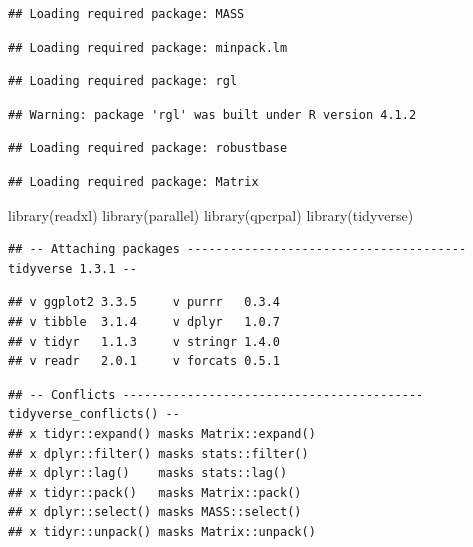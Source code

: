 \documentclass[
]{book}
\newenvironment{Shaded}{\begin{snugshade}}{\end{snugshade}}
\newcommand{\FunctionTok}[1]{\textcolor[rgb]{0.00,0.00,0.00}{#1}}
\newcommand{\NormalTok}[1]{#1}
\begin{document}
\begin{verbatim}
## Loading required package: MASS
\end{verbatim}

\begin{verbatim}
## Loading required package: minpack.lm
\end{verbatim}

\begin{verbatim}
## Loading required package: rgl
\end{verbatim}

\begin{verbatim}
## Warning: package 'rgl' was built under R version 4.1.2
\end{verbatim}

\begin{verbatim}
## Loading required package: robustbase
\end{verbatim}

\begin{verbatim}
## Loading required package: Matrix
\end{verbatim}

\begin{Shaded}
\begin{Highlighting}[]
\FunctionTok{library}\NormalTok{(readxl)}
\FunctionTok{library}\NormalTok{(parallel)}
\FunctionTok{library}\NormalTok{(qpcrpal)}
\FunctionTok{library}\NormalTok{(tidyverse)}
\end{Highlighting}
\end{Shaded}

\begin{verbatim}
## -- Attaching packages --------------------------------------- tidyverse 1.3.1 --
\end{verbatim}

\begin{verbatim}
## v ggplot2 3.3.5     v purrr   0.3.4
## v tibble  3.1.4     v dplyr   1.0.7
## v tidyr   1.1.3     v stringr 1.4.0
## v readr   2.0.1     v forcats 0.5.1
\end{verbatim}

\begin{verbatim}
## -- Conflicts ------------------------------------------ tidyverse_conflicts() --
## x tidyr::expand() masks Matrix::expand()
## x dplyr::filter() masks stats::filter()
## x dplyr::lag()    masks stats::lag()
## x tidyr::pack()   masks Matrix::pack()
## x dplyr::select() masks MASS::select()
## x tidyr::unpack() masks Matrix::unpack()
\end{verbatim}
\end{document}
